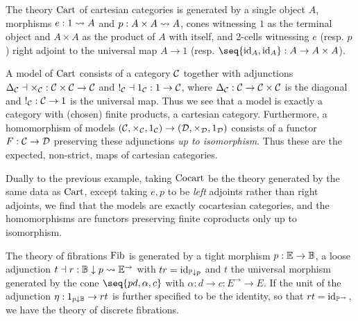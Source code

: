 \documentclass[../thesis.tex]{subfiles}
\begin{document}
\begin{example}
  The theory ${\mathrm{Cart}}$ of cartesian categories is generated by a single object $A$, morphisms
  $e : 1 \rightsquigarrow A$ and $p : A \times A \rightsquigarrow A$, cones witnessing $1$ as the terminal object
  and $A \times A$ as the product of $A$ with itself, and 2-cells witnessing $e$ (resp. $p$)
  right adjoint to the universal map $A \to 1$ (resp. $\seq{\id_A, \id_A} : A \to A \times A$).

  A model of ${\mathrm{Cart}}$ consists of a category ${\mathcal{C}}$ together with adjunctions $\Delta_{\mathcal{C}} \dashv \times_{\mathcal{C}}
  : {\mathcal{C}} \times {\mathcal{C}} \to {\mathcal{C}}$ and $!_{\mathcal{C}} \dashv 1_{\mathcal{C}} : 1 \to {\mathcal{C}}$, where $\Delta_{\mathcal{C}} : {\mathcal{C}} \to {\mathcal{C}} \times
  {\mathcal{C}}$ is the diagonal and $!_{\mathcal{C}} : {\mathcal{C}} \to 1$ is the universal map. Thus we see that a model is exactly
  a category with (chosen) finite products, a cartesian category. Furthermore, a homomorphism of models
  $({\mathcal{C}},\times_{\mathcal{C}},1_{\mathcal{C}}) \to ({\mathcal{D}}, \times_{\mathcal{D}}, 1_{\mathcal{D}})$ consists of a functor $F : {\mathcal{C}} \to {\mathcal{D}}$ preserving
  these adjunctions \emph{up to isomorphism}. Thus these are the expected, non-strict, maps of cartesian
  categories.
\end{example}
\begin{example}
  Dually to the previous example, taking ${\mathrm{Cocart}}$ be the theory generated by the same data as ${\mathrm{Cart}}$,
  except taking $e,p$ to be \emph{left} adjoints rather than right adjoints, we find that the models
  are exactly cocartesian categories, and the homomorphisms are functors preserving finite coproducts
  only up to isomorphism.
\end{example}
\begin{example}\label{ex:fib}
  The theory of fibrations ${\mathrm{Fib}}$ is generated by a tight morphism $p : {\mathbb{E}} \to {\mathbb{B}}$, a loose adjunction $
  t \dashv r : {\mathbb{B}} \mathrel{\downarrow} p \rightsquigarrow {\mathbb{E}}^\to$ with $tr = {\mathrm{id}}_{{\mathbb{P}} \mathrel{\downarrow} p}$ and $t$ the universal morphism
  generated by the cone $\seq{p d, \alpha, c}$ with $\alpha : d \to c : E^\to \to E$. If the unit of the
  adjunction $\eta : 1_{p \mathrel{\downarrow} {\mathbb{B}}} \to rt$ is further specified to be the identity, so that $rt = \id_%
  {\bP^\to}$, we have the theory of discrete fibrations.
\end{example}
\end{document}
